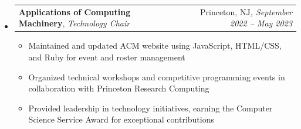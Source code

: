 \documentclass[a4paper,11pt]{article}
\makeatletter
\newcommand{\sectionspace}{\vspace{-0pt}}
\newcommand{\resumeSubheadingalt}[4]{
\vspace{0.5mm}\item %
    \begin{tabular*}{0.98\textwidth}[t]{l@{\extracolsep{\fill}}r}
        \textbf{#1}, \textit{\footnotesize{#3}} &  \footnotesize{#2}\textit{\footnotesize{, #4}} \\
   
    \end{tabular*}
    \vspace{-2.4mm} %
}
\newenvironment{resumeSubHeadingList}{\begin{itemize}[leftmargin=*,labelsep=1.2mm, label={}]}{\end{itemize}\vspace{2mm}} %
\newenvironment{resumeItemList}{\begin{justify}\begin{itemize}[leftmargin=3ex, rightmargin=2ex, noitemsep,labelsep=1.2mm,itemsep=0mm]\small}{\end{itemize}\end{justify}\vspace{-2mm}}  %
\newcommand{\bulletend}{}
\makeatother
\begin{document}
\begin{resumeSubHeadingList}
    \resumeSubheadingalt{Applications of Computing Machinery}{Princeton, NJ}
    {Technology Chair}{September 2022 -- May 2023}
    \vspace{-1.0mm}%
    \begin{resumeItemList}
        \item {Maintained and updated ACM website using JavaScript, HTML/CSS, and Ruby for event and roster management\bulletend}
        \item {Organized technical workshops and competitive programming events in collaboration with Princeton Research Computing\bulletend}
        \item  {Provided leadership in technology initiatives, earning the Computer Science Service Award for exceptional contributions\bulletend}
    \end{resumeItemList}
\end{resumeSubHeadingList}
\vspace{-8.5mm}  %
\sectionspace
\end{document}
